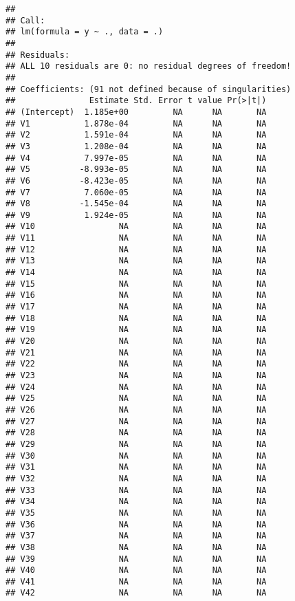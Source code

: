 \documentclass[
]{article}
\begin{document}
\begin{verbatim}
## 
## Call:
## lm(formula = y ~ ., data = .)
## 
## Residuals:
## ALL 10 residuals are 0: no residual degrees of freedom!
## 
## Coefficients: (91 not defined because of singularities)
##               Estimate Std. Error t value Pr(>|t|)
## (Intercept)  1.185e+00         NA      NA       NA
## V1           1.878e-04         NA      NA       NA
## V2           1.591e-04         NA      NA       NA
## V3           1.208e-04         NA      NA       NA
## V4           7.997e-05         NA      NA       NA
## V5          -8.993e-05         NA      NA       NA
## V6          -8.423e-05         NA      NA       NA
## V7           7.060e-05         NA      NA       NA
## V8          -1.545e-04         NA      NA       NA
## V9           1.924e-05         NA      NA       NA
## V10                 NA         NA      NA       NA
## V11                 NA         NA      NA       NA
## V12                 NA         NA      NA       NA
## V13                 NA         NA      NA       NA
## V14                 NA         NA      NA       NA
## V15                 NA         NA      NA       NA
## V16                 NA         NA      NA       NA
## V17                 NA         NA      NA       NA
## V18                 NA         NA      NA       NA
## V19                 NA         NA      NA       NA
## V20                 NA         NA      NA       NA
## V21                 NA         NA      NA       NA
## V22                 NA         NA      NA       NA
## V23                 NA         NA      NA       NA
## V24                 NA         NA      NA       NA
## V25                 NA         NA      NA       NA
## V26                 NA         NA      NA       NA
## V27                 NA         NA      NA       NA
## V28                 NA         NA      NA       NA
## V29                 NA         NA      NA       NA
## V30                 NA         NA      NA       NA
## V31                 NA         NA      NA       NA
## V32                 NA         NA      NA       NA
## V33                 NA         NA      NA       NA
## V34                 NA         NA      NA       NA
## V35                 NA         NA      NA       NA
## V36                 NA         NA      NA       NA
## V37                 NA         NA      NA       NA
## V38                 NA         NA      NA       NA
## V39                 NA         NA      NA       NA
## V40                 NA         NA      NA       NA
## V41                 NA         NA      NA       NA
## V42                 NA         NA      NA       NA

\end{verbatim}
\end{document}
